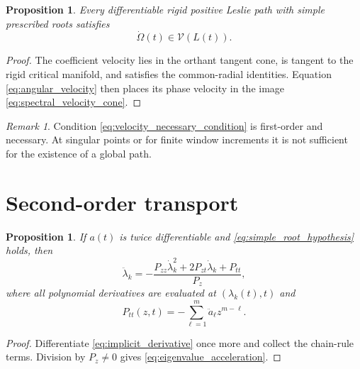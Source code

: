 \documentclass[11pt]{amsart}
\numberwithin{equation}{section}
\theoremstyle{plain}
\newtheorem{proposition}[theorem]{Proposition}
\theoremstyle{definition}
\theoremstyle{remark}
\newtheorem{remark}[theorem]{Remark}
\begin{document}
\begin{proposition}
\label{prop:necessary_velocity_condition}
Every differentiable rigid positive Leslie path with simple prescribed roots satisfies
\begin{equation}
\dot\Omega(t)\in\mathcal V(L(t)).
\label{eq:velocity_necessary_condition}
\end{equation}
\end{proposition}

\begin{proof}
The coefficient velocity lies in the orthant tangent cone, is tangent to the rigid critical manifold, and satisfies the common-radial identities.  Equation \eqref{eq:angular_velocity} then places its phase velocity in the image \eqref{eq:spectral_velocity_cone}.
\end{proof}

\begin{remark}
\label{rem:necessary_not_sufficient}
Condition \eqref{eq:velocity_necessary_condition} is first-order and necessary.  At singular points or for finite window increments it is not sufficient for the existence of a global path.
\end{remark}

\section{Second-order transport}
\label{sec:second_order_transport}

\begin{proposition}
\label{prop:second_derivative}
If $a(t)$ is twice differentiable and \eqref{eq:simple_root_hypothesis} holds, then
\begin{equation}
\ddot\lambda_k
=-
\frac{
P_{zz}\dot\lambda_k^2
+2P_{zt}\dot\lambda_k
+P_{tt}
}{P_z},
\label{eq:eigenvalue_acceleration}
\end{equation}
where all polynomial derivatives are evaluated at $(\lambda_k(t),t)$ and
\begin{equation}
P_{tt}(z,t)
=-\sum_{\ell=1}^{m}\ddot a_\ell z^{m-\ell}.
\label{eq:second_time_derivative}
\end{equation}
\end{proposition}

\begin{proof}
Differentiate \eqref{eq:implicit_derivative} once more and collect the chain-rule terms.  Division by $P_z\neq0$ gives \eqref{eq:eigenvalue_acceleration}.
\end{proof}
\end{document}
